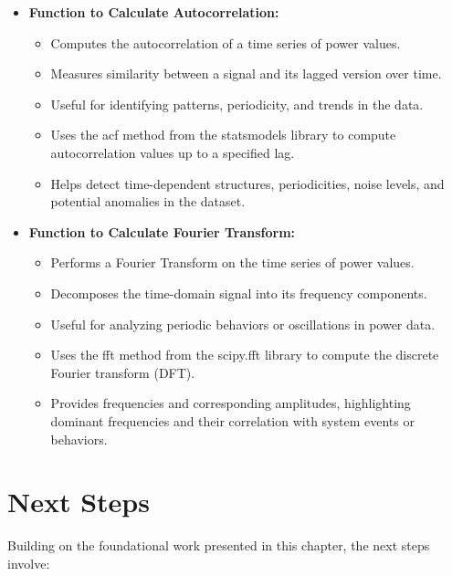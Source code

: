 \begin{itemize}
\begin{itemize}
    \end{itemize}
    \item \textbf{Function to Calculate Autocorrelation:}
    \begin{itemize}
        \item Computes the autocorrelation of a time series of power values.
        \item Measures similarity between a signal and its lagged version over time.
        \item Useful for identifying patterns, periodicity, and trends in the data.
        \item Uses the acf method from the statsmodels library to compute autocorrelation values up to a specified lag.
        \item Helps detect time-dependent structures, periodicities, noise levels, and potential anomalies in the dataset.
    \end{itemize}
    
    \item \textbf{Function to Calculate Fourier Transform:}
    \begin{itemize}
        \item Performs a Fourier Transform on the time series of power values.
        \item Decomposes the time-domain signal into its frequency components.
        \item Useful for analyzing periodic behaviors or oscillations in power data.
        \item Uses the fft method from the scipy.fft library to compute the discrete Fourier transform (DFT).
        \item Provides frequencies and corresponding amplitudes, highlighting dominant frequencies and their correlation with system events or behaviors.
    \end{itemize}
\end{itemize}

\section{Next Steps}

Building on the foundational work presented in this chapter, the next steps involve:

